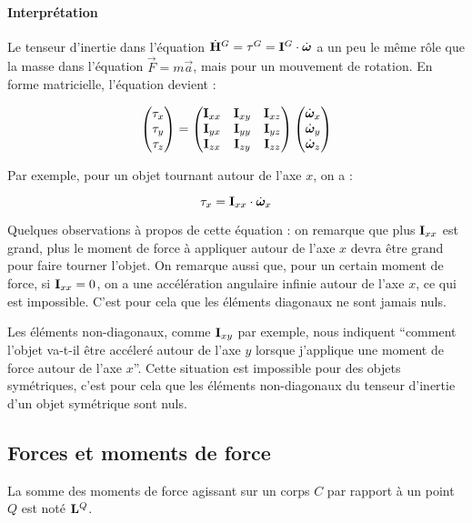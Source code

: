 \paragraph{Interprétation}
Le tenseur d'inertie dans l'équation $\dot{{\bf H}}^G = \tau^G = {\bf I}^G\cdot\dot{\bm \omega}$ a un peu le même
rôle que la masse dans l'équation $\vec{F} = m \vec{a}$, mais pour un mouvement de rotation.
En forme matricielle, l'équation devient :

$$
\begin{pmatrix} 
	\tau_x \\
	\tau_y \\
	\tau_z
\end{pmatrix}
=
\begin{pmatrix}
	{\bf I}_{xx} & {\bf I}_{xy} & {\bf I}_{xz} \\
	{\bf I}_{yx} & {\bf I}_{yy} & {\bf I}_{yz} \\
	{\bf I}_{zx} & {\bf I}_{zy} & {\bf I}_{zz}
\end{pmatrix}
\begin{pmatrix}
	\dot{\bm \omega}_x \\
	\dot{\bm \omega}_y \\
	\dot{\bm \omega}_z
\end{pmatrix}
$$

Par exemple, pour un objet tournant autour de l'axe $x$, on a :

$$\tau_x = {\bf I}_{xx} \cdot \dot{\bm \omega}_x$$

Quelques observations à propos de cette équation :
on remarque que plus ${\bf I}_{xx}$ est grand, plus le moment de force 
à appliquer autour de l'axe $x$ devra être grand pour faire tourner l'objet.
On remarque aussi que, pour un certain moment de force, si ${\bf I}_{xx} = 0$, on
a une accélération angulaire infinie autour de l'axe $x$, ce qui est impossible. 
C'est pour cela que les éléments diagonaux ne sont jamais nuls.

Les éléments non-diagonaux, comme ${\bf I}_{xy}$ par exemple, nous indiquent ``comment
l'objet va-t-il être accéleré autour de l'axe $y$ lorsque j'applique une moment
de force autour de l'axe $x$''. Cette situation est impossible pour des objets symétriques,
c'est pour cela que les éléments non-diagonaux du tenseur d'inertie d'un objet symétrique
sont nuls.

\subsection{Forces et moments de force}
La somme des moments de force agissant sur un corps $C$ par rapport à un point $Q$ est noté ${\bf L}^Q$.

